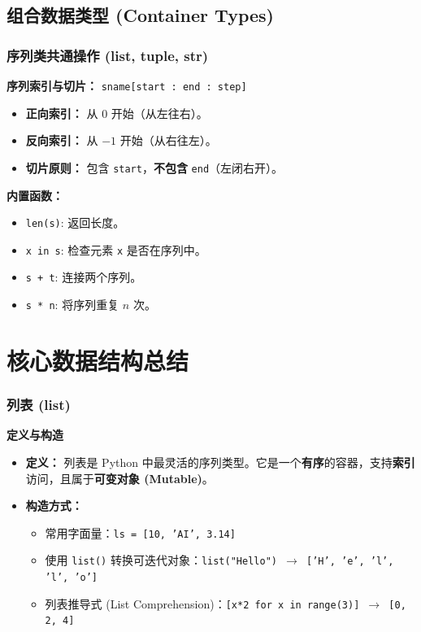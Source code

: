 \documentclass{article}
\begin{document}
\subsection{组合数据类型 (Container Types)}

\subsubsection{序列类共通操作 (list, tuple, str)}
\textbf{序列索引与切片：} \texttt{sname[start : end : step]}


\begin{itemize}
    \item \textbf{正向索引：} 从 $0$ 开始（从左往右）。
    \item \textbf{反向索引：} 从 $-1$ 开始（从右往左）。
    \item \textbf{切片原则：} 包含 \texttt{start}，\textbf{不包含} \texttt{end}（左闭右开）。
\end{itemize}

\textbf{内置函数：}
\begin{itemize}
    \item \texttt{len(s)}: 返回长度。
    \item \texttt{x in s}: 检查元素 \texttt{x} 是否在序列中。
    \item \texttt{s + t}: 连接两个序列。
    \item \texttt{s * n}: 将序列重复 $n$ 次。
\end{itemize}

\section{核心数据结构总结}

\subsubsection{列表 (list)}

\textbf{定义与构造}
\begin{itemize}
    \item \textbf{定义：} 列表是 Python 中最灵活的序列类型。它是一个\textbf{有序}的容器，支持\textbf{索引}访问，且属于\textbf{可变对象 (Mutable)}。
    \item \textbf{构造方式：}
    \begin{itemize}
        \item 常用字面量：\texttt{ls = [10, 'AI', 3.14]}
        \item 使用 \texttt{list()} 转换可迭代对象：\texttt{list("Hello") $\rightarrow$ ['H', 'e', 'l', 'l', 'o']}
        \item 列表推导式 (List Comprehension)：\texttt{[x*2 for x in range(3)] $\rightarrow$ [0, 2, 4]}
    \end{itemize}
\end{itemize}
\end{document}
